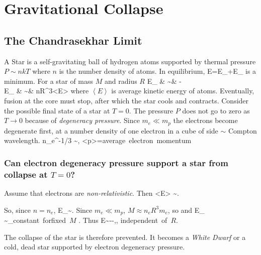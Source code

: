
\chapter{Gravitational Collapse}

\section{The Chandrasekhar Limit}

A Star is a self-gravitating ball of hydrogen atoms supported by thermal
pressure $P \sim nkT$ where $n$ is the number density of atoms. In equilibrium,
\be
E=E_{}+E_{}
\ee
is a minimum.  For a star of mass $M$ and radius $R$
\bea
E_{} & \sim & - \\
E_{} & \sim & nR^3\left<E\right>
\eea
where $\left<E\right>$ is average kinetic energy of atoms.  Eventually, fusion 
at the core must stop, after which the star cools and contracts.  Consider the
possible final state of a star at $T=0$. The pressure $P$ does not go to zero as
$T\to 0$ because of \emph{degeneracy pressure}. 
Since $m_e\ll m_p$ the electrons become degenerate first, at a number density 
of one electron in a cube of side $\sim$ Compton wavelength.
\be
n_e^{-1/3} \sim {}, \quad 
\left<p\right>=\mbox{average electron momentum}
\ee

\subsection*{Can electron degeneracy pressure support a star from collapse at 
$T=0$?}

Assume that electrons are \emph{non-relativistic}.  Then
\be
\left<E\right> \sim {}.
\ee

So, since $n=n_e$,
\be
E_{}\sim {}.
\ee
Since $m_e \ll m_p$, $M\approx n_eR^3m_e$, so 
 and 
\be
E_{} \sim {}_{\mbox{constant for}\atop\mbox{fixed $M$}}
.
\ee
Thus 
\be
E\sim --,\quad \alpha,
\beta\mbox{independent of $R$}.
\ee
\begin{center}\end{center}
The collapse of the star is therefore prevented. It becomes a 
\emph{White Dwarf} or a cold, dead star supported by electron
degeneracy pressure. \\

